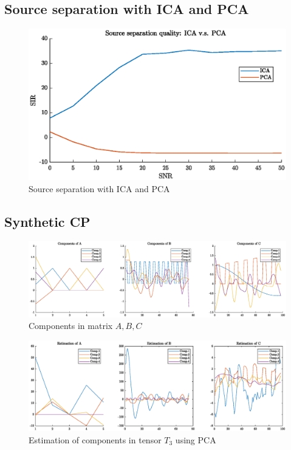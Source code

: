 \documentclass[pagesize,english,DIV=calc,footinclude=false
]{scrartcl}
\begin{document}
\subsection{Source separation with ICA and PCA}

\begin{figure}[htbp]
  \centering
  \includegraphics[width=0.7\linewidth]{ica_pca.eps}
  \caption{Source separation with ICA and PCA}
  \label{fig:ica_pca}
\end{figure}



\subsection{Synthetic CP}

\begin{figure}[htbp]
  \centering
  \includegraphics[width=\linewidth]{ABC_comp.eps}
  \caption{Components in matrix $A, B, C$}
  \label{fig:ABC_comp}
\end{figure}


\begin{figure}[htbp]
  \centering
  \includegraphics[width=\linewidth]{PCA_comp.eps}
  \caption{Estimation of components in tensor $T_3$ using PCA}
  \label{fig:PCA_comp}
\end{figure}
\end{document}
